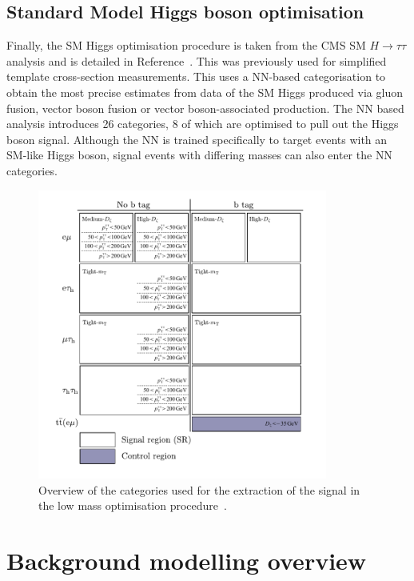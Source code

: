 \subsection{Standard Model Higgs boson optimisation}

Finally, the \ac{SM} Higgs optimisation procedure is taken from the \ac{CMS} \ac{SM} $H \rightarrow \tau\tau$ analysis and is detailed in Reference~\cite{CMS:2022kdi}.
This was previously used for simplified template cross-section measurements.
This uses a \ac{NN}-based categorisation to obtain the most precise estimates from data of the \ac{SM} Higgs produced via gluon fusion, vector boson fusion or vector boson-associated production.
The \ac{NN} based analysis introduces 26 categories, 8 of which are optimised to pull out the Higgs boson signal.
Although the \ac{NN} is trained specifically to target events with an \ac{SM}-like Higgs boson, signal events with differing masses can also enter the \ac{NN} categories.

\begin{figure}[!hbtp]
\centering
    \includegraphics[width=0.85\textwidth]{Figures/low_mass_categories.pdf}
\caption{Overview of the categories used for the extraction of the signal in the low mass optimisation procedure~\cite{CMS:2022rbd}.}
\label{fig:low_mass_categories}
\end{figure}

\section{Background modelling overview}
\label{sec:background_modelling}

